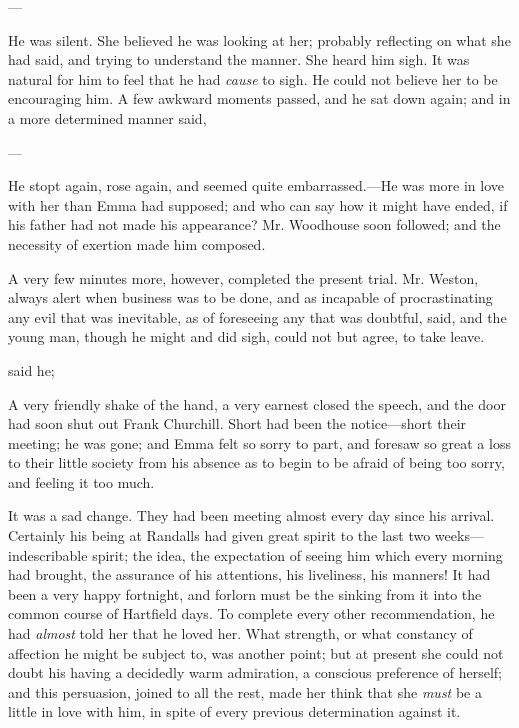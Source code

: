 ---

He was silent. She believed he was looking at her; probably reflecting on what she had said, and trying to understand the manner. She heard him sigh. It was natural for him to feel that he had {\em cause} to sigh. He could not believe her to be encouraging him. A few awkward moments passed, and he sat down again; and in a more determined manner said,

---

He stopt again, rose again, and seemed quite embarrassed.---He was more in love with her than Emma had supposed; and who can say how it might have ended, if his father had not made his appearance? Mr. Woodhouse soon followed; and the necessity of exertion made him composed.

A very few minutes more, however, completed the present trial. Mr. Weston, always alert when business was to be done, and as incapable of procrastinating any evil that was inevitable, as of foreseeing any that was doubtful, said,  and the young man, though he might and did sigh, could not but agree, to take leave.

 said he; 

A very friendly shake of the hand, a very earnest  closed the speech, and the door had soon shut out Frank Churchill. Short had been the notice---short their meeting; he was gone; and Emma felt so sorry to part, and foresaw so great a loss to their little society from his absence as to begin to be afraid of being too sorry, and feeling it too much.

It was a sad change. They had been meeting almost every day since his arrival. Certainly his being at Randalls had given great spirit to the last two weeks---indescribable spirit; the idea, the expectation of seeing him which every morning had brought, the assurance of his attentions, his liveliness, his manners! It had been a very happy fortnight, and forlorn must be the sinking from it into the common course of Hartfield days. To complete every other recommendation, he had {\em almost} told her that he loved her. What strength, or what constancy of affection he might be subject to, was another point; but at present she could not doubt his having a decidedly warm admiration, a conscious preference of herself; and this persuasion, joined to all the rest, made her think that she {\em must} be a little in love with him, in spite of every previous determination against it.

